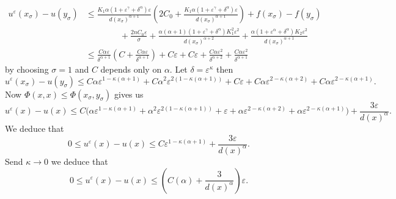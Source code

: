 \documentclass[10pt]{article}
\theoremstyle{plain}
\theoremstyle{remark}
\begin{document}
\begin{align*}
    u^\varepsilon(x_\sigma) - u(y_\sigma)& \leq \frac{K_1\alpha(1+\varepsilon^\gamma+\delta^\alpha)\varepsilon}{d(x_\sigma)^{\alpha+1}}\left(2C_0+ \frac{K_1\alpha(1+\varepsilon^\gamma+\delta^\alpha)\varepsilon}{d(x_\sigma)^{\alpha+1}}\right) + f(x_\sigma) - f(y_\sigma)\\
    & \qquad\qquad +\frac{2nC_0\varepsilon}{\sigma} + \frac{\alpha(\alpha+1)(1+\varepsilon^\gamma+\delta^\alpha)K_1^2\varepsilon^2}{d(x_\sigma)^{\alpha+2}} + \frac{\alpha (1+\varepsilon^\alpha+\delta^\alpha)K_2 \varepsilon^2}{d(x_\sigma)^{\alpha+1}}\\
    &\leq \frac{C\alpha \varepsilon}{\delta^{\alpha+1}}\left(C+\frac{C\alpha \varepsilon}{\delta^{\alpha+1}}\right) + C\varepsilon  + C\varepsilon + \frac{C\alpha \varepsilon^2}{\delta^{\alpha+2}} + \frac{C\alpha \varepsilon^2}{\delta^{\alpha+1}}
\end{align*}
by choosing $\sigma = 1$ and $C$ depends only on $\alpha$. Let $\delta = \varepsilon^\kappa$ then
\begin{equation*}
    u^\varepsilon(x_\sigma) - u(y_\sigma) \leq C\alpha \varepsilon^{1-\kappa(\alpha+1)} + C\alpha^2 \varepsilon^{2(1-\kappa(\alpha+1))} + C\varepsilon + C\alpha \varepsilon^{2-\kappa(\alpha+2)} + C\alpha \varepsilon^{2-\kappa(\alpha+1)}.
\end{equation*}
Now $\Phi(x,x)\leq \Phi(x_\sigma,y_\sigma)$ gives us
\begin{equation*}
    u^\varepsilon(x) - u(x)\leq C \Big(\alpha \varepsilon^{1-\kappa(\alpha+1)} + \alpha^2 \varepsilon^{2(1-\kappa(\alpha+1))} + \varepsilon + \alpha \varepsilon^{2-\kappa(\alpha+2)} + \alpha \varepsilon^{2-\kappa(\alpha+1)} \Big) + \frac{3\varepsilon}{d(x)^\alpha}.
\end{equation*}
We deduce that
\begin{equation*}
    0\leq u^\varepsilon(x) - u(x)\leq C\varepsilon^{1-\kappa(\alpha+1)} + \frac{3\varepsilon}{d(x)^\alpha}.
\end{equation*}
Send $\kappa\to 0$ we deduce that
\begin{equation*}
    0\leq u^\varepsilon(x) - u(x)\leq \left(C(\alpha) +\frac{3}{d(x)^\alpha}\right)\varepsilon.
\end{equation*}
\end{document}
